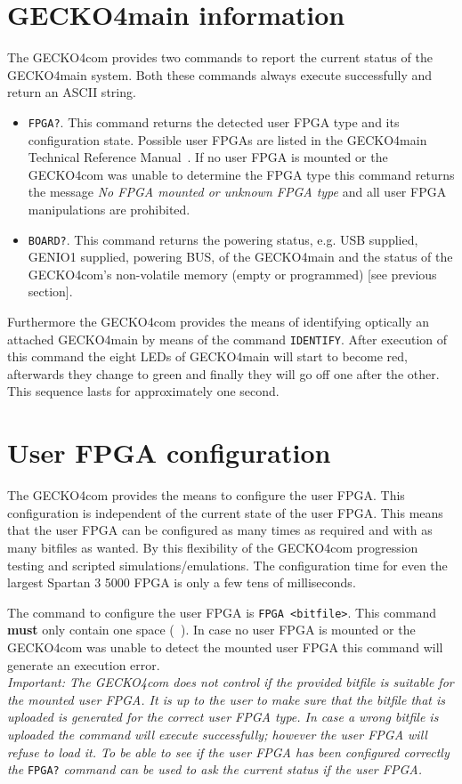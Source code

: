 \section{{\sc GECKO4main} information}
\label{sec: main info}
The {\sc GECKO4com} provides two commands to report the current status of the
{\sc GECKO4main} system. Both these commands always execute successfully and
return an ASCII string.
\begin{itemize}
\item \verb+FPGA?+. This command returns the detected user FPGA type and its
configuration state. Possible user FPGAs are listed in the {\sc GECKO4main}
Technical Reference Manual~\cite{gecko4main}. If no user FPGA is
mounted or the {\sc GECKO4com} was unable to determine the FPGA type this
command returns the message \emph{No FPGA mounted or unknown FPGA type} and all
user FPGA manipulations are prohibited.
\item \verb+BOARD?+. This command returns the powering status, e.g. USB
supplied, GENIO1 supplied, powering BUS, of the {\sc GECKO4main} and the status
of the {\sc GECKO4com}'s non-volatile memory (empty or programmed) [see previous
section].
\end{itemize}
Furthermore the {\sc GECKO4com} provides the means of identifying optically an
attached {\sc GECKO4main} by means of the command \verb+IDENTIFY+. After
execution of this command the eight LEDs of {\sc GECKO4main} will start to
become red, afterwards they change to green and finally they will go off one
after the other. This sequence lasts for approximately one second.
\section{User FPGA configuration}
The {\sc GECKO4com} provides the means to configure the user FPGA. This
configuration is independent of the current state of the user FPGA. This means
that the user FPGA can be configured as many times as required and with as many
bitfiles as wanted. By this flexibility of the {\sc GECKO4com} progression
testing and scripted simulations/emulations. The configuration time for even the
largest Spartan 3 5000 FPGA is only a few tens of milliseconds.

The command to configure the user FPGA is \verb*+FPGA <bitfile>+. This command
\textbf{must} only contain one space (\verb*+ +). In case no user FPGA is
mounted or the {\sc GECKO4com} was unable to detect the mounted user FPGA  this
command will generate an execution error.\\
\textit{Important: The {\sc GECKO4com} does not control if the provided bitfile
is suitable for the mounted user FPGA. It is up to the user to make sure that
the bitfile that is uploaded is generated for the correct user FPGA type. In
case a wrong bitfile is uploaded the command will execute successfully; however
the user FPGA will refuse to load it. To be able to see if the user FPGA has
been configured correctly the }\verb+FPGA?+\textit{ command can be used to ask
the current status if the user FPGA. \important}
